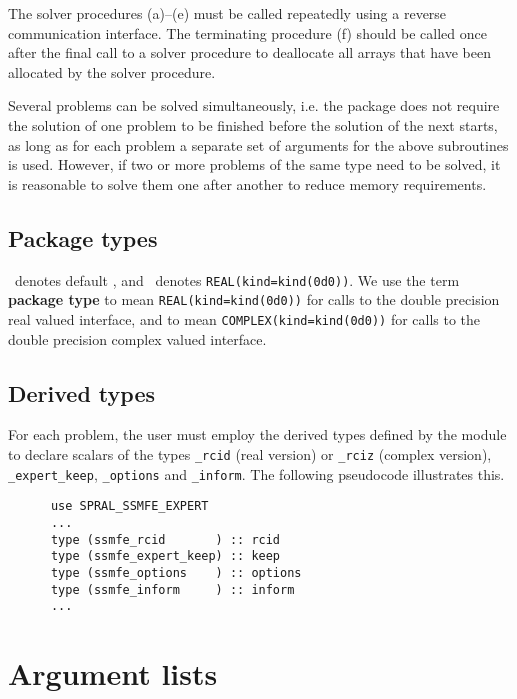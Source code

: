 The solver procedures (a)--(e)
must be called repeatedly using
a reverse communication interface.
The terminating procedure (f)
should be called once after the
final call to 
a solver procedure
to deallocate all arrays 
that have been allocated by %
the solver procedure.

Several problems can be solved simultaneously,
i.e. the package does not require the solution of
one problem to be finished before the solution of
the next starts, as long as for each problem a separate set
of arguments for the above subroutines is used.
However, if two or more problems of the same type
need to be solved, it is reasonable to solve them one
after another  to reduce  memory requirements.
\fi

\subsection{Package types} 

\Integer\ denotes default \Integer, and \REALDP\ denotes
\texttt{REAL(kind=kind(0d0))}. We use the term {\bf package type} to mean
\texttt{REAL(kind=kind(0d0))} for calls to the double precision real valued
interface, and to mean \texttt{COMPLEX(kind=kind(0d0))} for calls to the double
precision complex valued interface.

\subsection{Derived types}
\label{derived types}

For each problem, the user must employ the derived types defined by the
module to declare scalars of the types 
{\tt \solver\_rcid} (real version) or 
{\tt \solver\_rciz} (complex version), 
{\tt \solver\_expert\_keep},
{\tt \solver\_options} and 
{\tt \solver\_inform}.
The following pseudocode illustrates this.
\begin{verbatim}
      use SPRAL_SSMFE_EXPERT
      ...
      type (ssmfe_rcid       ) :: rcid
      type (ssmfe_expert_keep) :: keep
      type (ssmfe_options    ) :: options
      type (ssmfe_inform     ) :: inform
      ...
\end{verbatim}


\section{Argument lists}


